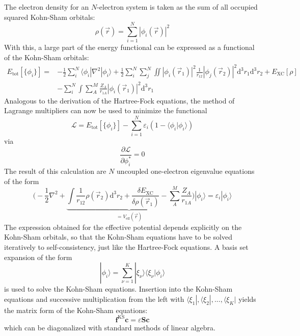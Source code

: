 \documentclass[9pt]{report}
\begin{document}
The electron density for an $N$-electron system is taken as the sum of all occupied squared Kohn-Sham orbitals:
\begin{equation}
\rho(\vec{r})=\sum_{i=1}^{N}|\phi_i(\vec{r})|^2
\end{equation}
With this, a large part of the energy functional can be expressed as a functional of the Kohn-Sham orbitals:
\begin{align}
E_{\mathrm{tot}}[\{\phi_i\}] =& -\frac{1}{2}\sum_{i}^{N}\langle\phi_i|\nabla^2|\phi_i\rangle +\frac{1}{2}\sum_{i}^{N}\sum_{j}^{N}\iint|\phi_i(\vec{r}_1)|^{2}\frac{1}{r_{12}}|\phi_j(\vec{r}_2)|^{2}\mathrm{d}^{3}r_{1}\mathrm{d}^{3}r_2 + E_{\mathrm{XC}}[\rho]\\ &-\sum_{i}^{N}\int\sum_{A}^{M}\frac{Z_A}{r_{1A}}|\phi_i(\vec{r}_1)|^{2}\mathrm{d}^{3}r_1
\end{align}
Analogous to the derivation of the Hartree-Fock equations, the method of Lagrange multipliers can now be used to minimize the functional
\begin{equation}
\mathcal{L}=E_{\mathrm{tot}}[\{\phi_i\}]-\sum_{i=1}^{N}\varepsilon_i(1-\langle\phi_i|\phi_i\rangle)
\end{equation}
via
\begin{equation}
\frac{\partial\mathcal{L}}{\partial\phi_i^*}=0
\end{equation}
The result of this calculation are $N$ uncoupled one-electron eigenvalue equations of the form
\begin{equation}
\bigg(-\frac{1}{2}\nabla^2 +\underbrace{\int\frac{1}{r_{12}}\rho(\vec{r}_2)\mathrm{d}^{3}r_2+\frac{\delta E_{\mathrm{XC}}}{\delta\rho(\vec{r}_1)}-\sum_{A}^{M}\frac{Z_A}{r_{1A}}}_{=V_{\mathrm{eff}}(\vec{r})}\bigg)|\phi_i\rangle =\varepsilon_{i}|\phi_i\rangle
\end{equation}
The expression obtained for the effective potential depends explicitly on the Kohn-Sham orbitals, so that the Kohn-Sham equations have to be solved iteratively to self-consistency, just like the Hartree-Fock equations. A basis set expansion of the form
\begin{equation}
|\phi_i\rangle=\sum_{\nu=1}^{K}|\xi_{\nu}\rangle\langle\xi_{\nu}|\phi_i\rangle
\end{equation}
is used to solve the Kohn-Sham equations. Insertion into the Kohn-Sham equations and successive multiplication from the left with $\langle\xi_1|,\langle\xi_2|,...,\langle\xi_K|$ yields the matrix form of the Kohn-Sham equations:
\begin{equation}
\boldsymbol{f}^{\mathrm{KS}}\boldsymbol{c}=\varepsilon\boldsymbol{S}\boldsymbol{c}
\end{equation}
which can be diagonalized with standard methods of linear algebra.
\end{document}
